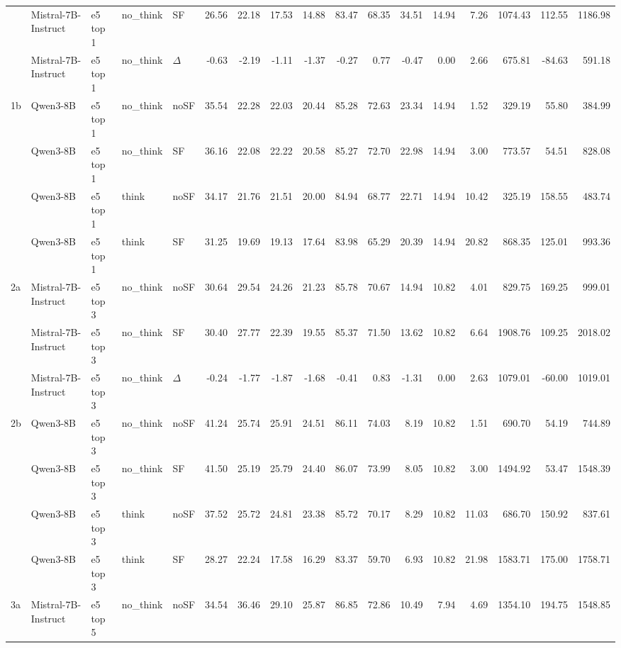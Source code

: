 \begin{landscape}
\begin{footnotesize}
\begin{longtable}{l l l l l r r r r r r r r r r r r}
 & Mistral-7B-Instruct & e5 top 1 & no\_think & SF & 26.56 & 22.18 & 17.53 & 14.88 & 83.47 & 68.35 & 34.51 & 14.94 & 7.26 & 1074.43 & 112.55 & 1186.98 \\
 & Mistral-7B-Instruct & e5 top 1 & no\_think & $\Delta$ & -0.63 & -2.19 & -1.11 & -1.37 & -0.27 & 0.77 & -0.47 & 0.00 & 2.66 & 675.81 & -84.63 & 591.18 \\
1b & Qwen3-8B & e5 top 1 & no\_think & noSF & 35.54 & 22.28 & 22.03 & 20.44 & 85.28 & 72.63 & 23.34 & 14.94 & 1.52 & 329.19 & 55.80 & 384.99 \\
 & Qwen3-8B & e5 top 1 & no\_think & SF & 36.16 & 22.08 & 22.22 & 20.58 & 85.27 & 72.70 & 22.98 & 14.94 & 3.00 & 773.57 & 54.51 & 828.08 \\
 & Qwen3-8B & e5 top 1 & think & noSF & 34.17 & 21.76 & 21.51 & 20.00 & 84.94 & 68.77 & 22.71 & 14.94 & 10.42 & 325.19 & 158.55 & 483.74 \\
 & Qwen3-8B & e5 top 1 & think & SF & 31.25 & 19.69 & 19.13 & 17.64 & 83.98 & 65.29 & 20.39 & 14.94 & 20.82 & 868.35 & 125.01 & 993.36 \\
\midrule
2a & Mistral-7B-Instruct & e5 top 3 & no\_think & noSF & 30.64 & 29.54 & 24.26 & 21.23 & 85.78 & 70.67 & 14.94 & 10.82 & 4.01 & 829.75 & 169.25 & 999.01 \\
 & Mistral-7B-Instruct & e5 top 3 & no\_think & SF & 30.40 & 27.77 & 22.39 & 19.55 & 85.37 & 71.50 & 13.62 & 10.82 & 6.64 & 1908.76 & 109.25 & 2018.02 \\
 & Mistral-7B-Instruct & e5 top 3 & no\_think & $\Delta$ & -0.24 & -1.77 & -1.87 & -1.68 & -0.41 & 0.83 & -1.31 & 0.00 & 2.63 & 1079.01 & -60.00 & 1019.01 \\
2b & Qwen3-8B & e5 top 3 & no\_think & noSF & 41.24 & 25.74 & 25.91 & 24.51 & 86.11 & 74.03 & 8.19 & 10.82 & 1.51 & 690.70 & 54.19 & 744.89 \\
 & Qwen3-8B & e5 top 3 & no\_think & SF & 41.50 & 25.19 & 25.79 & 24.40 & 86.07 & 73.99 & 8.05 & 10.82 & 3.00 & 1494.92 & 53.47 & 1548.39 \\
 & Qwen3-8B & e5 top 3 & think & noSF & 37.52 & 25.72 & 24.81 & 23.38 & 85.72 & 70.17 & 8.29 & 10.82 & 11.03 & 686.70 & 150.92 & 837.61 \\
 & Qwen3-8B & e5 top 3 & think & SF & 28.27 & 22.24 & 17.58 & 16.29 & 83.37 & 59.70 & 6.93 & 10.82 & 21.98 & 1583.71 & 175.00 & 1758.71 \\
\midrule
3a & Mistral-7B-Instruct & e5 top 5 & no\_think & noSF & 34.54 & 36.46 & 29.10 & 25.87 & 86.85 & 72.86 & 10.49 & 7.94 & 4.69 & 1354.10 & 194.75 & 1548.85 \\

\end{longtable}
\end{footnotesize}
\end{landscape}
